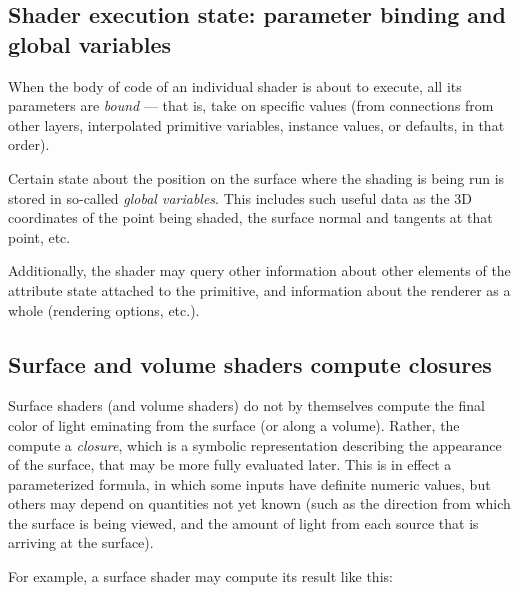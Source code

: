 \documentclass[11pt,letterpaper]{book}
\begin{document}
%

\subsection*{Shader execution state: parameter binding and global variables}

When the body of code of an individual shader is about to execute, all
its parameters are \emph{bound} --- that is, take on specific values
(from connections from other layers, interpolated primitive variables,
instance values, or defaults, in that order).

Certain state about the position on the surface where the shading is
being run is stored in so-called \emph{global variables}.  This includes
such useful data as the 3D coordinates of the point being shaded, the
surface normal and tangents at that point, etc.

Additionally, the shader may query other information about other
elements of the attribute state attached to the primitive, and
information about the renderer as a whole (rendering options, etc.).

\subsection*{Surface and volume shaders compute closures}

Surface shaders (and volume shaders) do not by themselves compute the
final color of light eminating from the surface (or along a volume).
Rather, the compute a \emph{closure}, which is a symbolic representation
describing the appearance of the surface, that may be more fully
evaluated later.  This is in effect a parameterized formula, in which
some inputs have definite numeric values, but others may depend on
quantities not yet known (such as the direction from which the surface
is being viewed, and the amount of light from each source that is
arriving at the surface).

For example, a surface shader may compute its result like this:
\end{document}
